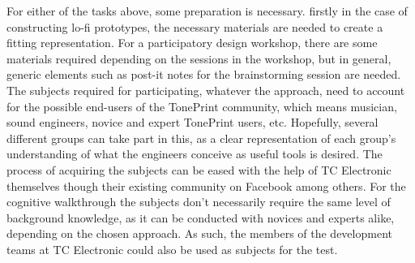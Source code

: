\noindent
For either of the tasks above, some preparation is necessary. firstly in the case of constructing lo-fi prototypes, the necessary materials are needed to create a fitting representation. For a participatory design workshop, there are some materials required depending on the sessions in the workshop, but in general, generic elements such as post-it notes for the brainstorming session are needed. The subjects required for participating, whatever the approach, need to account for the possible end-users of the TonePrint community, which means musician, sound engineers, novice and expert TonePrint users, etc. Hopefully, several different groups can take part in this, as a clear representation of each group's understanding of what the engineers conceive as useful tools is desired. The process of acquiring the subjects can be eased with the help of TC Electronic themselves though their existing community on Facebook among others. For the cognitive walkthrough the subjects don't necessarily require the same level of background knowledge, as it can be conducted with novices and experts alike, depending on the chosen approach. As such, the members of the development teams at TC Electronic could also be used as subjects for the test.\\

